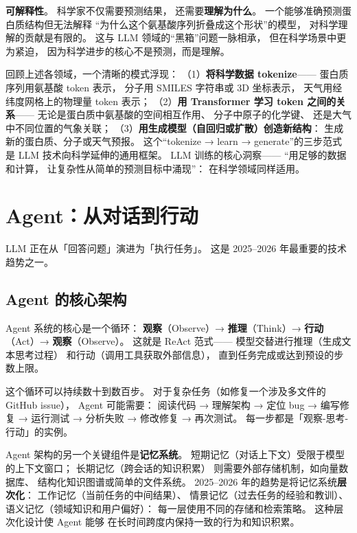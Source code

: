\textbf{可解释性}。
科学家不仅需要预测结果，
还需要\textbf{理解为什么}。
一个能够准确预测蛋白质结构但无法解释
“为什么这个氨基酸序列折叠成这个形状”的模型，
对科学理解的贡献是有限的。
这与 LLM 领域的“黑箱”问题一脉相承，
但在科学场景中更为紧迫，
因为科学进步的核心不是预测，而是理解。

\begin{keybox}
回顾上述各领域，一个清晰的模式浮现：
（1）\textbf{将科学数据 tokenize}——
蛋白质序列用氨基酸 token 表示，
分子用 SMILES 字符串或 3D 坐标表示，
天气用经纬度网格上的物理量 token 表示；
（2）\textbf{用 Transformer 学习 token 之间的关系}——
无论是蛋白质中氨基酸的空间相互作用、
分子中原子的化学键、
还是大气中不同位置的气象关联；
（3）\textbf{用生成模型（自回归或扩散）创造新结构}：
生成新的蛋白质、分子或天气预报。
这个“tokenize → learn → generate”的三步范式
是 LLM 技术向科学延伸的通用框架。
LLM 训练的核心洞察——
“用足够的数据和计算，
让复杂性从简单的预测目标中涌现”：
在科学领域同样适用。
\end{keybox}


\section{Agent：从对话到行动}

LLM 正在从「回答问题」演进为「执行任务」。
这是 2025--2026 年最重要的技术趋势之一。

\subsection{Agent 的核心架构}

Agent 系统的核心是一个循环：
\textbf{观察}（Observe）→
\textbf{推理}（Think）→
\textbf{行动}（Act）→
\textbf{观察}（Observe）。
这就是 ReAct 范式——
模型交替进行推理（生成文本思考过程）
和行动（调用工具获取外部信息），
直到任务完成或达到预设的步数上限。

这个循环可以持续数十到数百步。
对于复杂任务（如修复一个涉及多文件的 GitHub issue），
Agent 可能需要：
阅读代码 → 理解架构 → 定位 bug →
编写修复 → 运行测试 → 分析失败 → 修改修复 → 再次测试。
每一步都是「观察-思考-行动」的实例。

Agent 架构的另一个关键组件是\textbf{记忆系统}。
短期记忆（对话上下文）受限于模型的上下文窗口；
长期记忆（跨会话的知识积累）
则需要外部存储机制，如向量数据库、
结构化知识图谱或简单的文件系统。
2025--2026 年的趋势是将记忆系统\textbf{层次化}：
工作记忆（当前任务的中间结果）、
情景记忆（过去任务的经验和教训）、
语义记忆（领域知识和用户偏好）：
每一层使用不同的存储和检索策略。
这种层次化设计使 Agent 能够
在长时间跨度内保持一致的行为和知识积累。

